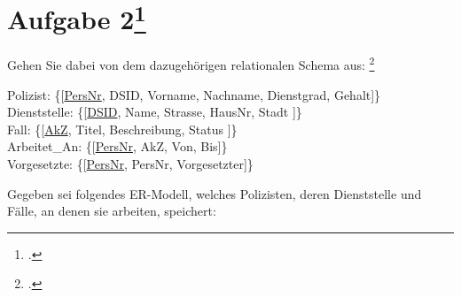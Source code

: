 \documentclass{lehramt-informatik-minimal}
\begin{document}
\section{Aufgabe 2\footcite{db:pu:3}}

\noindent
Gehen Sie dabei von dem dazugehörigen relationalen Schema aus:
\footcite[DB/ST - Frühjahr 2016, 66116, Thema 1, TA 1, A 2]{examen:66116:2016:03}
\bigskip

{
\noindent
\ttfamily
\footnotesize
Polizist: \{[\underline{PersNr}, DSID, Vorname, Nachname, Dienstgrad, Gehalt]\}\\
Dienststelle: \{[\underline{DSID}, Name, Strasse, HausNr, Stadt ]\}\\
Fall: \{[\underline{AkZ}, Titel, Beschreibung, Status ]\}\\
Arbeitet\_An: \{[\underline{PersNr}, AkZ, Von, Bis]\}\\
Vorgesetzte: \{[\underline{PersNr}, PersNr, Vorgesetzter]\}
}

\bigskip

\noindent
Gegeben sei folgendes ER-Modell, welches Polizisten, deren Dienststelle
und Fälle, an denen sie arbeiten, speichert:
\end{document}
